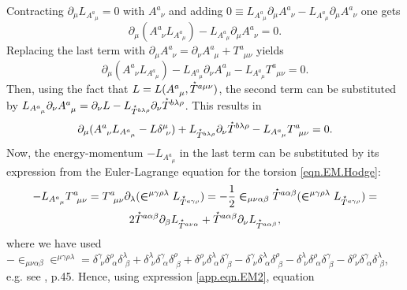 \documentclass[
10pt, %
a4paper, %
oneside, %
headinclude,footinclude, %
BCOR5mm, %
]{scrartcl}
\newcommand{\pd}[1]{\partial_{#1}}
\newcommand{\tetr}[2]{A^{#1}_{\phantom{#1}#2}}
\newcommand{\Tors}[2]{T^{#1}_{\phantom{a}#2}}
\newcommand{\Laghodge}{L}%
\newcommand{\LCsymb}{\bm{\in}}    %
\newcommand{\HDT}[1]{\accentset{\star}{T}^{#1}}
\newcommand{\KD}[2]{\delta^{#1}_{\,\,#2}}
\begin{document}
Contracting $ \pd{\mu} \Laghodge_{\tetr{a}{\mu}} = 0 $ with $ \tetr{a}{\nu} $ and adding $ 0\equiv 
\Laghodge_{\tetr{a}{\mu}}\pd{\mu}\tetr{a}{\nu} -  \Laghodge_{\tetr{a}{\mu}}\pd{\mu}\tetr{a}{\nu} $ 
one gets
\begin{equation}
\pd{\mu}(\tetr{a}{\nu}\Laghodge_{\tetr{a}{\mu}}) - \Laghodge_{\tetr{a}{\mu}}\pd{\mu}\tetr{a}{\nu} = 
0.
\end{equation}
Replacing the last term with $ \pd{\mu}\tetr{a}{\nu} = \pd{\nu}\tetr{a}{\mu} + \Tors{a}{\mu\nu} $ 
yields
\begin{equation}
\pd{\mu}(\tetr{a}{\nu}\Laghodge_{\tetr{a}{\mu}}) - \Laghodge_{\tetr{a}{\mu}}\pd{\nu}\tetr{a}{\mu} - 
\Laghodge_{\tetr{a}{\mu}}\Tors{a}{\mu\nu} = 0.
\end{equation}
Then, using the fact that $ L = L(\tetr{a}{\mu},\HDT{a\mu\nu}) $, the second term can be 
substituted 
by $ \Laghodge_{\tetr{a}{\mu}}\pd{\nu}\tetr{a}{\mu} = \pd{\nu}\Laghodge - 
\Laghodge_{\HDT{b\lambda\rho}}\pd{\nu}\HDT{b\lambda\rho} $. This results in
\begin{equation}\label{app.eqn.EM1}
\pd{\mu}(\tetr{a}{\nu}\Laghodge_{\tetr{a}{\mu}} - L \delta^\mu_{\ \nu}) +
\Laghodge_{\HDT{b\lambda\rho}}\pd{\nu}\HDT{b\lambda\rho} -
\Laghodge_{\tetr{a}{\mu}}\Tors{a}{\mu\nu} = 0.
\end{equation} 
Now, the energy-momentum $ -\Laghodge_{\tetr{a}{\mu}} $ in the last term can be substituted by its 
expression from the Euler-Lagrange equation for the torsion \eqref{eqn.EM.Hodge}:
\begin{multline}\label{app.eqn.EM2}
	-\Laghodge_{\tetr{a}{\mu}}\Tors{a}{\mu\nu} = 
	\Tors{a}{\mu\nu}\pd{\lambda}(\LCsymb^{\mu\gamma\rho\lambda}\Laghodge_{\HDT{a\gamma\rho}}) =
	-\frac12\LCsymb_{\mu\nu\alpha\beta}\HDT{a\alpha\beta}(\LCsymb^{\mu\gamma\rho\lambda}\Laghodge_{\HDT{a\gamma\rho}})
	 =
	 \\
	2\HDT{a\alpha\beta}\pd{\beta}\Laghodge_{\HDT{a\nu\alpha}} + 
	\HDT{a\alpha\beta}\pd{\nu}\Laghodge_{\HDT{a\alpha\beta}},
\end{multline}
where we have used  $ 
-\LCsymb_{\mu\nu\alpha\beta}\LCsymb^{\mu\gamma\rho\lambda} = 
\KD{\gamma}{\nu}\KD{\rho}{\alpha}\KD{\lambda}{\beta} +
\KD{\lambda}{\nu}\KD{\gamma}{\alpha}\KD{\rho}{\beta} +
\KD{\rho}{\nu}\KD{\lambda}{\alpha}\KD{\gamma}{\beta} -
\KD{\gamma}{\nu}\KD{\lambda}{\alpha}\KD{\rho}{\beta} -
\KD{\lambda}{\nu}\KD{\rho}{\alpha}\KD{\gamma}{\beta} -
\KD{\rho}{\nu}\KD{\gamma}{\alpha}\KD{\lambda}{\beta}
$, e.g. see \cite{KleinertMultivalued}, p.45. Hence, using expression \eqref{app.eqn.EM2}, equation 
\end{document}
